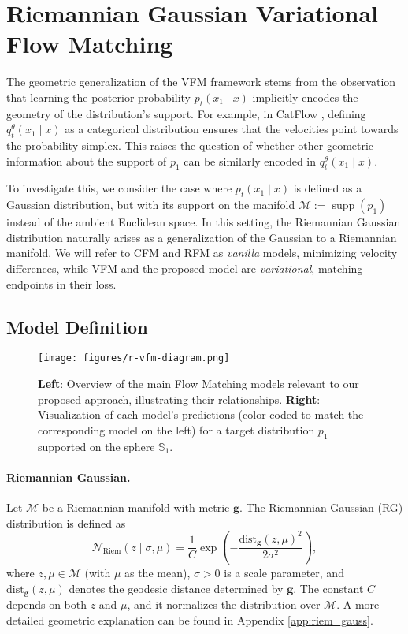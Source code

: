 \section{Riemannian Gaussian Variational Flow Matching}\label{sec:method}

The geometric generalization of the VFM framework stems from the observation that learning the posterior probability $p_t(x_1\mid x)$ implicitly encodes the geometry of the distribution’s support. For example, in CatFlow \citep{eijkelboom2024variational}, defining $q_t^{\theta}(x_1\mid x)$ as a categorical distribution ensures that the velocities point towards the probability simplex.  This raises the question of whether other geometric information about the support of $p_1$ can be similarly encoded in $q_t^{\theta}(x_1\mid x)$.

To investigate this, we consider the case where $p_t(x_1\mid x)$ is defined as a Gaussian distribution, but with its support on the manifold $\mathcal{M}:= \operatorname{supp}(p_1)$ instead of the ambient Euclidean space. In this setting, the Riemannian Gaussian distribution naturally arises as a generalization of the Gaussian to a Riemannian manifold. We will refer to CFM and RFM as \textit{vanilla} models, minimizing velocity differences, while VFM and the proposed model are \textit{variational}, matching endpoints in their loss.

\subsection{Model Definition}
\begin{figure}[t!]
    \centering
    \texttt{[image: figures/r-vfm-diagram.png]} 
    \caption{\textbf{Left}: Overview of the main Flow Matching models relevant to our proposed approach, illustrating their relationships. \textbf{Right}: Visualization of each model’s predictions (color-coded to match the corresponding model on the left) for a target distribution \(p_1\) supported on the sphere \(\mathbb{S}_1\).
    }
    \label{fig:schema}
\end{figure}

\paragraph{Riemannian Gaussian.} Let \(\mathcal{M}\) be a Riemannian manifold with metric \(\mathbf{g}\). The Riemannian Gaussian (RG) distribution \citep{pennec2006intrinsic} is defined as
\begin{equation}
    \mathcal{N}_{\text{Riem}}(z \mid \sigma, \mu) 
= \frac{1}{C} \exp\!\left(-\frac{\text{dist}_{\mathbf{g}}(z, \mu)^2}{2\sigma^2}\right),
\end{equation}
where \(z,\mu\in\mathcal{M}\) (with \(\mu\) as the mean), \(\sigma>0\) is a scale parameter, and \(\text{dist}_{\mathbf{g}}(z, \mu)\) denotes the geodesic distance determined by \(\mathbf{g}\). The constant $C$ depends on both $z$ and $\mu$, 
and it normalizes the distribution over \(\mathcal{M}\). A more detailed geometric explanation can be found in Appendix \ref{app:riem_gauss}. 


